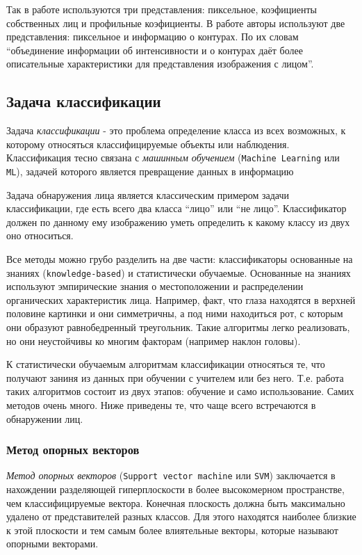 \documentclass[12pt]{report}
\begin{document}
Так в работе \citep{bojkovic2006face} используются три представления: пиксельное, коэфициенты собственных лиц и профильные коэфициенты. В работе \citep{ahmadyfard2008hierarchical} авторы используют две представления: пиксельное и информацию о контурах. По их словам ``объединение информации об интенсивности и о контурах даёт более описательные характеристики для представления изображения с лицом''.

\subsection{Задача классификации}
\label{classficators}
Задача \emph{классификации} - это проблема определение класса из всех возможных, к которому относяться классифицируемые объекты или наблюдения. Классификация тесно связана с \emph{машинным обучением} (\texttt{Machine Learning} или \texttt{ML}), задачей которого является превращение данных в информацию \citep{bradski2008learning}

Задача обнаружения лица является классическим примером задачи классификации, где есть всего два класса ``лицо'' или ``не лицо''. Классификатор должен по данному ему изображению уметь определить к какому классу из двух оно относиться.

Все методы можно грубо разделить на две части: классификаторы основанные на знаниях (\texttt{knowledge-based}) и статистически обучаемые. Основанные на знаниях используют эмпирические знания о местоположении и распределении органических характеристик лица. \citep{bojkovic2006face} Например, факт, что глаза находятся в верхней половине картинки и они симметричны, а под ними находиться рот, с которым они образуют равнобедренный треугольник. Такие алгоритмы легко реализовать, но они неустойчивы ко многим факторам (например наклон головы).

К статистически обучаемым алгоритмам классификации относяться те, что получают заниня из данных при обучении с учителем или без него. Т.е. работа таких алгоритмов состоит из двух этапов: обучение и само использование. Самих методов очень много. Ниже приведены те, что чаще всего встречаются в обнаружении лиц. 

\subsubsection{Метод опорных векторов}
\emph{Метод опорных векторов} (\texttt{Support vector machine} или \texttt{SVM}) заключается в нахождении разделяющей гиперплоскости в более высокомерном пространстве, чем классифицируемые вектора. Конечная плоскость должна быть максимально удалено от представителей разных классов. Для этого находятся наиболее близкие к этой плоскости и тем самым более влиятельные векторы, которые называют опорными векторами. \citep{shavers2006svm}
\end{document}
